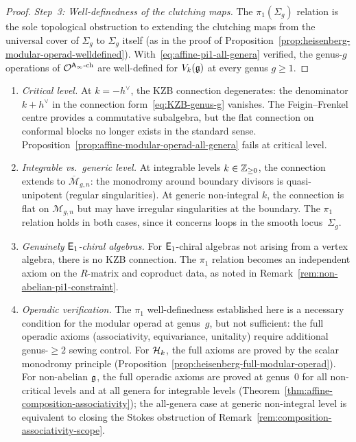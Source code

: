 \begin{proof}
\medskip\noindent
\emph{Step~3: Well-definedness of the clutching maps.}
The $\pi_1(\Sigma_g)$ relation is the sole
topological obstruction to extending the clutching
maps from the universal cover of $\Sigma_g$ to
$\Sigma_g$ itself
\textup{(}as in the proof of
Proposition~\ref{prop:heisenberg-modular-operad-welldefined}\textup{)}.
With~\eqref{eq:affine-pi1-all-genera} verified,
the genus-$g$ operations of
$\mathcal{O}^{\mathsf{A}_{\infty}\text{-ch}}$ are well-defined
for $V_k(\mathfrak{g})$ at every genus $g \ge 1$.
\end{proof}

\begin{remark}
\label{rem:affine-modular-operad-scope}
\begin{enumerate}[label=\textup{(\alph*)}]
\item \emph{Critical level.}
At $k = -h^\vee$, the KZB connection
degenerates: the denominator $k + h^\vee$ in the
connection form~\eqref{eq:KZB-genus-g} vanishes.
The Feigin--Frenkel centre provides a commutative
subalgebra, but the flat connection on conformal
blocks no longer exists in the standard sense.
Proposition~\ref{prop:affine-modular-operad-all-genera}
fails at critical level.
\item \emph{Integrable vs.\ generic level.}
At integrable levels $k \in \mathbb{Z}_{\ge 0}$,
the connection extends to
$\overline{\mathcal{M}}_{g,n}$: the monodromy
around boundary divisors is quasi-unipotent
\textup{(}regular singularities\textup{)}.
At generic non-integral $k$, the connection is
flat on $\mathcal{M}_{g,n}$ but may have irregular
singularities at the boundary.
The $\pi_1$ relation holds in both cases, since
it concerns loops in the smooth
locus~$\Sigma_g$.
\item \emph{Genuinely $\mathsf{E}_1$-chiral algebras.}
For $\mathsf{E}_1$-chiral algebras not arising from
a vertex algebra, there is no KZB connection.
The $\pi_1$ relation becomes an independent
axiom on the $R$-matrix and coproduct data,
as noted in
Remark~\ref{rem:non-abelian-pi1-constraint}.
\item \emph{Operadic verification.}
The $\pi_1$ well-definedness established here
is a necessary condition for the modular operad
at genus~$g$, but not sufficient: the full
operadic axioms
\textup{(}associativity, equivariance,
unitality\textup{)} require additional
genus-$\ge 2$ sewing control.
For $\mathcal{H}_k$, the full axioms are proved by the
scalar monodromy principle
\textup{(}Proposition~\ref{prop:heisenberg-full-modular-operad}\textup{)}.
For non-abelian $\mathfrak{g}$, the full operadic axioms are
proved at genus~$0$ for all non-critical levels and
at all genera for integrable levels
\textup{(}Theorem~\ref{thm:affine-composition-associativity}\textup{)};
the all-genera case at generic non-integral level
is equivalent to closing the Stokes obstruction of
Remark~\ref{rem:composition-associativity-scope}.
\end{enumerate}
\end{remark}

